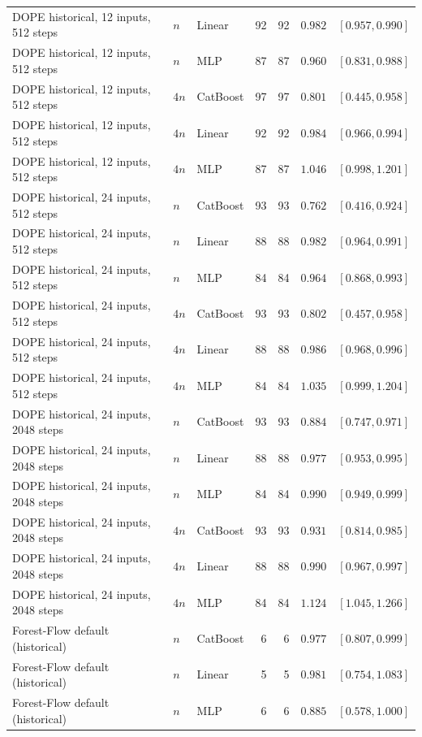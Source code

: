 \begin{longtable}{@{}p{1.6in}llrrrl@{}}
DOPE historical, 12 inputs, 512 steps & $n$ & Linear & 92 & 92 & $0.982$ & $[0.957, 0.990]$ \\
DOPE historical, 12 inputs, 512 steps & $n$ & MLP & 87 & 87 & $0.960$ & $[0.831, 0.988]$ \\
DOPE historical, 12 inputs, 512 steps & $4n$ & CatBoost & 97 & 97 & $0.801$ & $[0.445, 0.958]$ \\
DOPE historical, 12 inputs, 512 steps & $4n$ & Linear & 92 & 92 & $0.984$ & $[0.966, 0.994]$ \\
DOPE historical, 12 inputs, 512 steps & $4n$ & MLP & 87 & 87 & $1.046$ & $[0.998, 1.201]$ \\
DOPE historical, 24 inputs, 512 steps & $n$ & CatBoost & 93 & 93 & $0.762$ & $[0.416, 0.924]$ \\
DOPE historical, 24 inputs, 512 steps & $n$ & Linear & 88 & 88 & $0.982$ & $[0.964, 0.991]$ \\
DOPE historical, 24 inputs, 512 steps & $n$ & MLP & 84 & 84 & $0.964$ & $[0.868, 0.993]$ \\
DOPE historical, 24 inputs, 512 steps & $4n$ & CatBoost & 93 & 93 & $0.802$ & $[0.457, 0.958]$ \\
DOPE historical, 24 inputs, 512 steps & $4n$ & Linear & 88 & 88 & $0.986$ & $[0.968, 0.996]$ \\
DOPE historical, 24 inputs, 512 steps & $4n$ & MLP & 84 & 84 & $1.035$ & $[0.999, 1.204]$ \\
DOPE historical, 24 inputs, 2048 steps & $n$ & CatBoost & 93 & 93 & $0.884$ & $[0.747, 0.971]$ \\
DOPE historical, 24 inputs, 2048 steps & $n$ & Linear & 88 & 88 & $0.977$ & $[0.953, 0.995]$ \\
DOPE historical, 24 inputs, 2048 steps & $n$ & MLP & 84 & 84 & $0.990$ & $[0.949, 0.999]$ \\
DOPE historical, 24 inputs, 2048 steps & $4n$ & CatBoost & 93 & 93 & $0.931$ & $[0.814, 0.985]$ \\
DOPE historical, 24 inputs, 2048 steps & $4n$ & Linear & 88 & 88 & $0.990$ & $[0.967, 0.997]$ \\
DOPE historical, 24 inputs, 2048 steps & $4n$ & MLP & 84 & 84 & $1.124$ & $[1.045, 1.266]$ \\
Forest-Flow default (historical) & $n$ & CatBoost & 6 & 6 & $0.977$ & $[0.807, 0.999]$ \\
Forest-Flow default (historical) & $n$ & Linear & 5 & 5 & $0.981$ & $[0.754, 1.083]$ \\
Forest-Flow default (historical) & $n$ & MLP & 6 & 6 & $0.885$ & $[0.578, 1.000]$ \\

\end{longtable}
